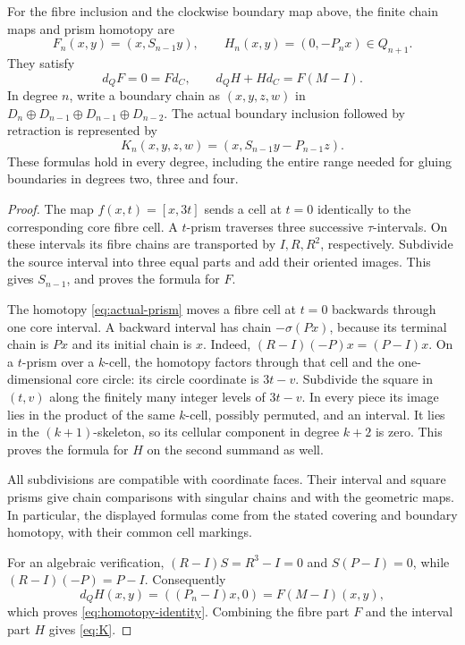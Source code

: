 \documentclass[11pt]{article}
\numberwithin{equation}{section}
\begin{document}
\begin{theorem}\label{thm:maps}
For the fibre inclusion and the clockwise boundary map above, the finite
chain maps and prism homotopy are
\begin{equation}\label{eq:F-H}
 F_n(x,y)=(x,S_{n-1}y),\qquad
 H_n(x,y)=(0,-P_nx)\in Q_{n+1}.
\end{equation}
They satisfy
\begin{equation}\label{eq:homotopy-identity}
 d_QF=0=Fd_C,\qquad d_QH+Hd_C=F(M-I).
\end{equation}
In degree $n$, write a boundary chain as
$(x,y,z,w)$ in
$D_n\oplus D_{n-1}\oplus D_{n-1}\oplus D_{n-2}$.
The actual boundary inclusion followed by retraction is represented by
\begin{equation}\label{eq:K}
 K_n(x,y,z,w)=(x,S_{n-1}y-P_{n-1}z).
\end{equation}
These formulas hold in every degree, including the entire range needed
for gluing boundaries in degrees two, three and four.
\end{theorem}
\begin{proof}
The map $f(x,t)=[x,3t]$ sends a cell at $t=0$ identically to the
corresponding core fibre cell. A $t$-prism traverses three successive
$\tau$-intervals. On these intervals its fibre chains are transported
by $I,R,R^2$, respectively. Subdivide the source interval into three
equal parts and add their oriented images. This gives $S_{n-1}$,
and proves the formula for $F$.

The homotopy \eqref{eq:actual-prism} moves a fibre cell at $t=0$
backwards through one core interval. A backward interval has chain
$-\sigma(Px)$, because its terminal chain is $Px$ and its initial
chain is $x$. Indeed,
$(R-I)(-P)x=(P-I)x$. On a $t$-prism over a $k$-cell, the
homotopy factors through that cell and the one-dimensional core circle:
its circle coordinate is $3t-v$. Subdivide the square in $(t,v)$
along the finitely many integer levels of $3t-v$. In every piece its
image lies in the product of the same $k$-cell, possibly permuted,
and an interval. It lies in the $(k+1)$-skeleton, so its cellular
component in degree $k+2$ is zero. This proves the formula for $H$
on the second summand as well.

All subdivisions are compatible with coordinate faces. Their interval
and square prisms give chain comparisons with singular chains and
with the geometric maps. In particular, the displayed formulas come
from the stated covering and boundary homotopy, with their common
cell markings.

For an algebraic verification, $(R-I)S=R^3-I=0$ and
$S(P-I)=0$, while $(R-I)(-P)=P-I$. Consequently
\[
 d_QH(x,y)=((P_n-I)x,0)=F(M-I)(x,y),
\]
which proves \eqref{eq:homotopy-identity}. Combining the fibre part
$F$ and the interval part $H$ gives \eqref{eq:K}.
\end{proof}
\end{document}
